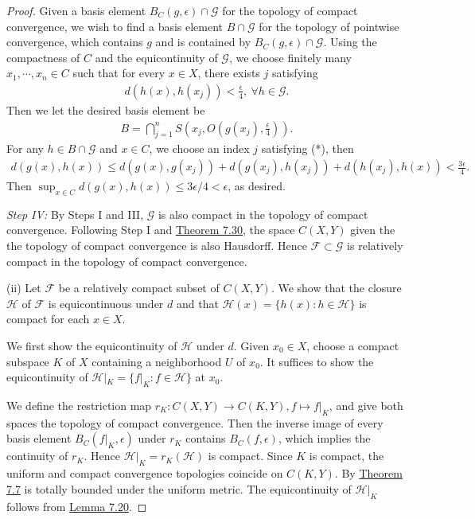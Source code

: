 \documentclass{article}
\numberwithin{equation}{section}
\theoremstyle{plain}
\theoremstyle{definition}
\begin{document}
\begin{proof}
Given a basis element $B_C(g,\epsilon)\cap\mathcal{G}$ for the topology of compact convergence, we wish to find a basis element $B\cap\mathcal{G}$ for the topology of pointwise convergence, which contains $g$ and is contained by $B_C(g,\epsilon)\cap\mathcal{G}$. Using the compactness of $C$ and the equicontinuity of $\mathcal{G}$, we choose finitely many $x_1,\cdots,x_n\in C$ such that for every $x\in X$, there exists $j$ satisfying
\begin{align*}
	d\left(h(x),h(x_j)\right) < \frac{\epsilon}{4},\ \forall h\in\mathcal{G}.\tag{*}
\end{align*}
Then we let the desired basis element be
\begin{align*}
	B = \bigcap_{j=1}^n S\left(x_j,O\left(g(x_j),\frac{\epsilon}{4}\right)\right).
\end{align*}
For any $h\in B\cap\mathcal{G}$ and $x\in C$, we choose an index $j$ satisfying (*), then
\begin{align*}
	d\left(g(x),h(x)\right) \leq d\left(g(x),g(x_j)\right) + d\left(g(x_j),h(x_j)\right) + d\left(h(x_j),h(x)\right) < \frac{3\epsilon}{4}.
\end{align*}
Then $\sup_{x\in C}d(g(x),h(x))\leq 3\epsilon/4 < \epsilon$, as desired.

\vspace{0.12cm}
\textit{Step IV:} By Steps I and III, $\mathcal{G}$ is also compact in the topology of compact convergence. Following Step I and \hyperref[thm:7.30]{Theorem 7.30}, the space $C(X,Y)$ given the the topology of compact convergence is also Hausdorff. Hence $\mathcal{F}\subset\mathcal{G}$ is relatively compact in the topology of compact convergence.

\vspace{0.25cm}
(ii) Let $\mathcal{F}$ be a relatively compact subset of $C(X,Y)$. We show that the closure $\mathcal{H}$ of $\mathcal{F}$ is equicontinuous under $d$ and that $\mathcal{H}(x)=\{h(x):h\in\mathcal{H}\}$ is compact for each $x\in X$.

We first show the equicontinuity of $\mathcal{H}$ under $d$. Given $x_0\in X$, choose a compact subspace $K$ of $X$ containing a neighborhood $U$ of $x_0$. It suffices to show the equicontinuity of $\mathcal{H}|_K=\{f|_K:f\in\mathcal{H}\}$ at $x_0$.

We define the restriction map $r_K:C(X,Y)\to C(K,Y),f\mapsto f|_K$, and give both spaces the topology of compact convergence. Then the inverse image of every basis element $B_C(f|_K,\epsilon)$ under $r_K$ contains $B_C(f,\epsilon)$, which implies the continuity of $r_K$. Hence $\mathcal{H}|_K=r_K(\mathcal{H})$ is compact. Since $K$ is compact, the uniform and compact convergence topologies coincide on $C(K,Y)$. By \hyperref[thm:7.7]{Theorem 7.7} is totally bounded under the uniform metric. The equicontinuity of $\mathcal{H}|_K$ follows from \hyperref[lemma:7.20]{Lemma 7.20}.


\end{proof}
\end{document}
